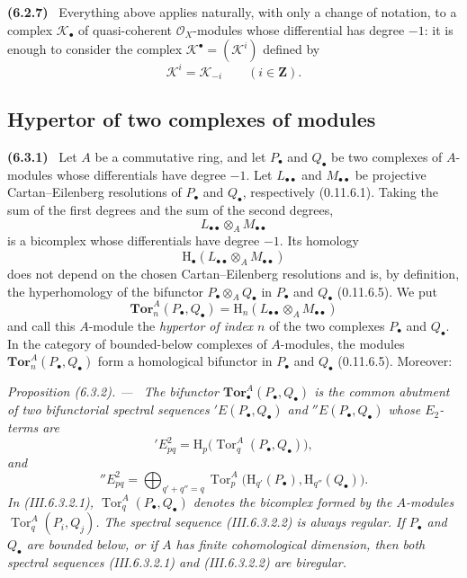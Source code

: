 \documentclass[10pt,oneside]{book}
\newcommand{\sh}[1]{\mathscr{#1}}
\newcommand{\HH}{\mathrm H}
\newcommand{\bb}[1]{\mathbf{#1}}
\newcommand{\Tor}{\operatorname{Tor}}
\newcommand{\sref}[2][]{(#2)}
\newcommand{\oldpage}[2][]{\setcounter{footnote}{0}\marginpar{\scriptsize\textbf{#1}~|~#2}\ignorespaces}
\newenvironment{env}[1][]{\par\medskip\noindent\textbf{(#1)}\ }{\par}
\newenvironment{proposition}[1][]{\par\medskip\noindent\itshape Proposition (#1). ---\ }{\par}
\begin{document}
\begin{env}[6.2.7]
\label{III.6.2.7}
Everything above applies naturally, with only a change of notation,
to a complex $\sh{K}_\bullet$ of quasi-coherent
$\sh{O}_X$-modules whose differential has degree $-1$: it is
enough to consider the complex
$\sh{K}^\bullet=(\sh{K}^i)$ defined by
\[
  \sh{K}^i=\sh{K}_{-i}
  \qquad(i\in\bb{Z}).
\]
\end{env}


\subsection{Hypertor of two complexes of modules}
\label{subsection:III.6.3}

\begin{env}[6.3.1]
\label{III.6.3.1}
Let $A$ be a commutative ring, and let $P_\bullet$ and
$Q_\bullet$ be two complexes of $A$-modules whose differentials
have degree $-1$.  Let $L_{\bullet\bullet}$ and
$M_{\bullet\bullet}$ be projective Cartan--Eilenberg resolutions
of $P_\bullet$ and $Q_\bullet$, respectively
\sref[0]{0.11.6.1}.  Taking the sum of the first degrees and the
sum of the second degrees,
\[
  L_{\bullet\bullet}\otimes_A M_{\bullet\bullet}
\]
is a bicomplex whose differentials have degree $-1$.  Its homology
\[
  \HH_\bullet(
    L_{\bullet\bullet}\otimes_A M_{\bullet\bullet}
  )
\]
does not depend on the chosen Cartan--Eilenberg resolutions and is,
by definition, the hyperhomology of the bifunctor
$P_\bullet\otimes_AQ_\bullet$ in $P_\bullet$ and $Q_\bullet$
\sref[0]{0.11.6.5}.  We put
\[
  \mathbf{Tor}_n^A(P_\bullet,Q_\bullet)
  =
  \HH_n(L_{\bullet\bullet}\otimes_A M_{\bullet\bullet})
  \tag{6.3.1.1}\label{III.6.3.1.1}
\]
\oldpage[III]{142}
and call this $A$-module the \emph{hypertor of index $n$} of the
two complexes $P_\bullet$ and $Q_\bullet$.  In the category of
bounded-below complexes of $A$-modules, the modules
$\mathbf{Tor}_n^A(P_\bullet,Q_\bullet)$ form a homological
bifunctor in $P_\bullet$ and $Q_\bullet$
\sref[0]{0.11.6.5}.  Moreover:
\end{env}

\begin{proposition}[6.3.2]
\label{III.6.3.2}
The bifunctor $\mathbf{Tor}_\bullet^A(P_\bullet,Q_\bullet)$ is the
common abutment of two bifunctorial spectral sequences
$'E(P_\bullet,Q_\bullet)$ and $''E(P_\bullet,Q_\bullet)$ whose
$E_2$-terms are
\[
  'E_{pq}^2
  =
  \HH_p\bigl(\Tor_q^A(P_\bullet,Q_\bullet)\bigr),
  \tag{6.3.2.1}\label{III.6.3.2.1}
\]
and
\[
  ''E_{pq}^2
  =
  \bigoplus_{q'+q''=q}
  \Tor_p^A\bigl(
    \HH_{q'}(P_\bullet),\HH_{q''}(Q_\bullet)
  \bigr).
  \tag{6.3.2.2}\label{III.6.3.2.2}
\]
In \sref{III.6.3.2.1},
$\Tor_q^A(P_\bullet,Q_\bullet)$ denotes the bicomplex formed by
the $A$-modules $\Tor_q^A(P_i,Q_j)$.  The spectral sequence
\sref{III.6.3.2.2} is always regular.  If $P_\bullet$ and
$Q_\bullet$ are bounded below, or if $A$ has finite cohomological
dimension, then both spectral sequences
\sref{III.6.3.2.1} and \sref{III.6.3.2.2} are biregular.
\end{proposition}
\end{document}
